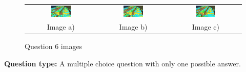\documentclass{kththesis}
\begin{document}
\begin{figure}[H]
\begin{tabular}{c c c}
\includegraphics[width=0.3\textwidth]{images/Results/MRF_survey/mrf_4_gamma_0.png} & \includegraphics[width=0.3\textwidth]{images/Results/MRF_survey/mrf_4_gamma_0_3.png} & \includegraphics[width=0.3\textwidth]{images/Results/MRF_survey/mrf_4_gamma_1.png}\\
Image a) & Image b) & Image c)
\end{tabular}
\caption{Question 6 images}
\label{fig:Q6}
\end{figure}
\textbf{Question type:} A multiple choice question with only one possible answer.
\end{document}
